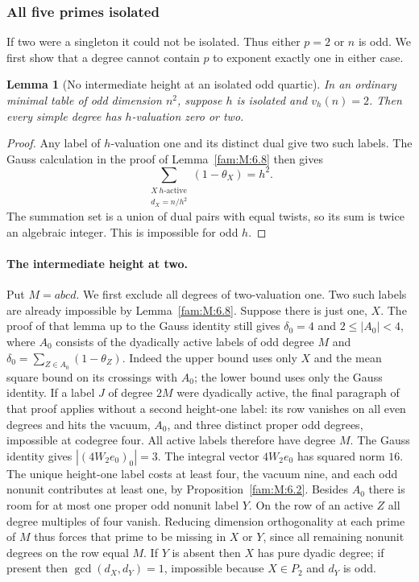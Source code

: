 \documentclass[11pt,a4paper]{article}
\numberwithin{equation}{section}
\newtheorem{lemma}[theorem]{Lemma}
\theoremstyle{remark}
\begin{document}
\subsubsection{All five primes isolated}\label{fam:F:sec:5.4}
If two were a singleton it could not be isolated. Thus either $p=2$ or $n$ is odd. We first show that a degree cannot contain $p$ to exponent exactly one in either case.
\begin{lemma}[No intermediate height at an isolated odd quartic]\label{fam:F:5.9}\label{fam:F:n:lem:isolated-quartic-odd-height}
In an ordinary minimal table of odd dimension $n^2$, suppose $h$ is
isolated and $v_h(n)=2$. Then every simple degree has $h$-valuation
zero or two.
\end{lemma}
\begin{proof}
Any label of $h$-valuation one and its distinct dual give two such
labels. The Gauss calculation in the proof of Lemma~\ref{fam:M:6.8}
then gives
\[
 \sum_{\substack{X\ h\text{-active}\\d_X=n/h^2}}
                (1-\theta_X)=h^2.
\]
The summation set is a union of dual pairs with equal twists, so its
sum is twice an algebraic integer. This is impossible for odd $h$.
\end{proof}
\paragraph{The intermediate height at two.} Put $M=abcd$. We first
exclude all degrees of two-valuation one. Two such labels
are already impossible by Lemma~\ref{fam:M:6.8}.
Suppose there is just one, $X$. The proof of that lemma up
to the Gauss identity still gives $\delta_0=4$ and
$2\le |A_0|<4$, where $A_0$ consists of the dyadically active labels
of odd degree $M$ and $\delta_0=\sum_{Z\in A_0}(1-\theta_Z)$.
Indeed the upper bound uses only $X$ and the mean square bound
on its crossings with $A_0$; the lower bound uses only the Gauss
identity. If a label $J$ of degree $2M$ were dyadically active,
the final paragraph of that proof applies without a second
height-one label: its row vanishes on all even degrees and hits the
vacuum, $A_0$, and three distinct proper odd degrees, impossible at
codegree four. All active labels therefore have degree $M$.
The Gauss identity gives $|(4W_2e_0)_0|=3$. The integral vector
$4W_2e_0$ has squared norm $16$. The unique height-one label costs
at least four, the vacuum nine, and each odd nonunit contributes
at least one, by Proposition~\ref{fam:M:6.2}. Besides $A_0$ there
is room for at most one proper odd nonunit label $Y$. On the row
of an active $Z$ all degree multiples of four vanish. Reducing
dimension orthogonality at each prime of $M$ thus forces that
prime to be missing in $X$ or $Y$, since all remaining nonunit
degrees on the row equal $M$. If $Y$ is absent then $X$ has pure
dyadic degree; if present then $\gcd(d_X,d_Y)=1$, impossible
because $X\in P_2$ and $d_Y$ is odd.
\end{document}
